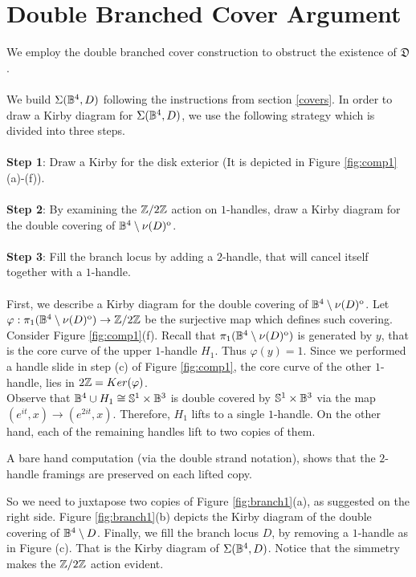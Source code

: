 \section{Double Branched Cover Argument} \label{buffet}
We employ the double branched cover construction to obstruct the existence of $\mathfrak{D}$. \\ \\ We build $\Sigma(\mathbb{B}^4, D)$ following the instructions from section \ref{covers}. 
In order to draw a Kirby diagram for $\Sigma(\mathbb{B}^4, D)$, we use the following strategy which is divided into three steps. \\ \\
\textbf{Step 1}: Draw a Kirby for the disk exterior (It is depicted in Figure \ref{fig:comp1}(a)-(f)).\\ \\
\textbf{Step 2}: By examining the $\mathbb{Z}/2\mathbb{Z}$ action on $1$-handles, draw a Kirby diagram for the double covering of $\mathbb{B}^4 \setminus \nu(D)^{\mathrm{o}}$. \\ \\
\textbf{Step 3}: Fill the branch locus by adding a $2$-handle, that will cancel itself together with a $1$-handle. \\ \\
 First, we describe a Kirby diagram for the double covering of $\mathbb{B}^4 \setminus \nu(D)^{\mathrm{o}}$. Let $\varphi: \pi_1(\mathbb{B}^4 \setminus \nu(D)^{\mathrm{o}}) \rightarrow \mathbb{Z}/2\mathbb{Z}$ be the surjective map which defines such covering. 
Consider Figure \ref{fig:comp1}(f). Recall that $\pi_1(\mathbb{B}^4 \setminus \nu(D)^{\mathrm{o}})$ is generated by $y$, that is the core curve of the upper $1$-handle $H_1$. Thus $\varphi(y) = 1$. Since we performed a handle slide in step (c) of Figure \ref{fig:comp1}, the core curve of the other $1$-handle, lies in $2\mathbb{Z} = Ker(\varphi)$. \\ Observe that $\mathbb{B}^4 \cup H_1 \cong \mathbb{S}^1 \times \mathbb{B}^3$ is double covered by $\mathbb{S}^1 \times \mathbb{B}^3$ via the map $(e^{it}, x) \rightarrow (e^{2it}, x)$. Therefore, $H_1$ lifts to a single $1$-handle. On the other hand, each of the remaining handles lift to two copies of them. 
\begin{note} A bare hand computation (via the double strand notation), shows that the $2$-handle framings are preserved on each lifted copy.
\end{note}
So we need to juxtapose two copies of Figure \ref{fig:branch1}(a), as suggested on the right side. Figure \ref{fig:branch1}(b) depicts the Kirby diagram of the double covering of $\mathbb{B}^4 \setminus D$. Finally, we fill the branch locus $D$, by removing a $1$-handle as in Figure (c). That is the Kirby diagram of $\Sigma(\mathbb{B}^4, D)$. Notice that the simmetry makes the $\mathbb{Z}/2\mathbb{Z}$ action evident. \\ \\
